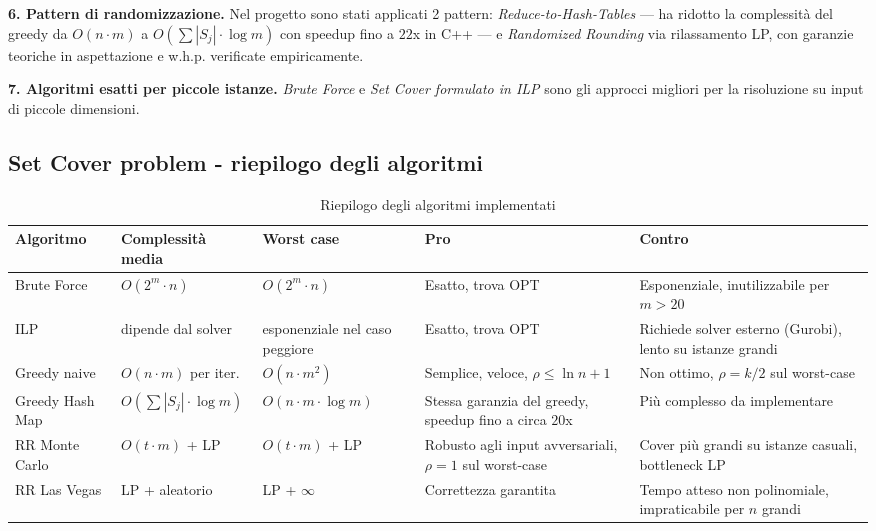 \documentclass[12pt, a4paper]{article}
\begin{document}
\textbf{6. Pattern di randomizzazione.}
Nel progetto sono stati applicati 2 pattern: \textit{Reduce-to-Hash-Tables} — ha ridotto la complessit\`a 
del greedy da $O(n \cdot m)$ a $O(\sum|S_j| \cdot \log m)$ 
con speedup fino a $22$x in C++ — e \textit{Randomized Rounding} 
via rilassamento LP, con garanzie teoriche in aspettazione 
e w.h.p. verificate empiricamente.

\textbf{7. Algoritmi esatti per piccole istanze.}
\textit{Brute Force} e \textit{Set Cover formulato in ILP} sono 
gli approcci migliori per la risoluzione su input di piccole dimensioni.

\subsection*{Set Cover problem - riepilogo degli algoritmi}

\begin{table}[H]
\centering
\caption{Riepilogo degli algoritmi implementati}
\label{tab:riepilogo}
\begin{tabular}{p{2.5cm}p{3cm}p{2.5cm}p{3cm}p{3cm}}
\toprule
Algoritmo & Complessit\`a media & Worst case & Pro & Contro \\
\midrule
Brute Force & $O(2^m \cdot n)$ & $O(2^m \cdot n)$ & 
Esatto, trova OPT & 
Esponenziale, inutilizzabile per $m > 20$ \\
\midrule
ILP & dipende dal solver & esponenziale nel caso peggiore & 
Esatto, trova OPT & 
Richiede solver esterno (Gurobi), lento su istanze grandi \\
\midrule
Greedy naive & $O(n \cdot m)$ per iter. & $O(n \cdot m^2)$ & 
Semplice, veloce, $\rho \leq \ln n + 1$ & 
Non ottimo, $\rho = k/2$ sul worst-case \\
\midrule
Greedy Hash Map & $O(\sum|S_j| \cdot \log m)$ & $O(n \cdot m \cdot \log m)$ & 
Stessa garanzia del greedy, speedup fino a circa $20$x & 
Pi\`u complesso da implementare \\
\midrule
RR Monte Carlo & $O(t \cdot m)$ + LP & $O(t \cdot m)$ + LP & 
Robusto agli input avversariali, $\rho=1$ sul worst-case & 
Cover pi\`u grandi su istanze casuali, bottleneck LP \\
\midrule
RR Las Vegas & LP + aleatorio & LP + $\infty$ & 
Correttezza garantita & 
Tempo atteso non polinomiale, impraticabile per $n$ grandi \\
\bottomrule
\end{tabular}
\end{table}
\newpage
\end{document}
